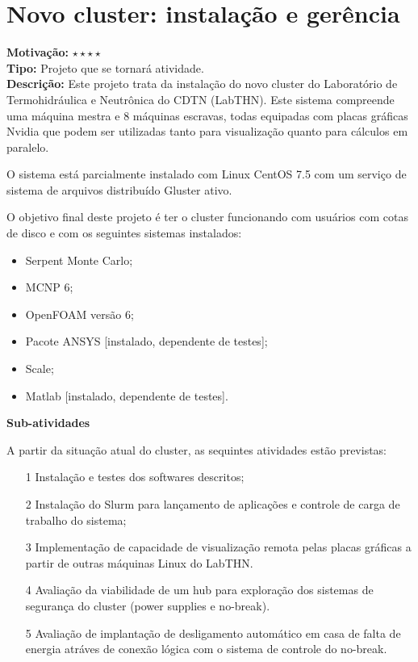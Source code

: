 \chapter{Novo cluster: instalação e gerência}

\textbf{Motivação:} $\star\star\star\star$\\

\textbf{Tipo:} Projeto que se tornará atividade.\\

\textbf{Descrição:} Este projeto trata da instalação do novo cluster do Laboratório 
de Termohidráulica e Neutrônica do CDTN (LabTHN). Este sistema compreende uma máquina 
mestra e 8 máquinas escravas, todas equipadas com placas gráficas Nvidia que podem 
ser utilizadas tanto para visualização quanto para cálculos em paralelo.

O sistema está parcialmente instalado com Linux CentOS 7.5 com um serviço de 
sistema de arquivos distribuído Gluster ativo. 

O objetivo final deste projeto é ter o cluster funcionando com usuários com cotas 
de disco e com os seguintes sistemas instalados:

\begin{itemize}
	\item Serpent Monte Carlo;
	\item MCNP 6;
	\item OpenFOAM versão 6;
	\item Pacote ANSYS [instalado, dependente de testes];
	\item Scale;
	\item Matlab [instalado, dependente de testes].
\end{itemize}

\textbf{Sub-atividades}

A partir da situação atual do cluster, as sequintes atividades estão previstas:
\begin{itemize}
	\item[1] Instalação e testes dos softwares descritos;
	\item[2] Instalação do Slurm para lançamento de aplicações e controle de 
	carga de trabalho do sistema;
	\item[3] Implementação de capacidade de visualização remota pelas placas gráficas a partir de outras máquinas Linux do LabTHN.
	\item[4] Avaliação da viabilidade de um hub para exploração dos sistemas de segurança do cluster (power supplies e no-break).
	\item[5] Avaliação de implantação de desligamento automático em casa de falta de energia atráves de conexão lógica com o sistema de controle do no-break.
\end{itemize}

